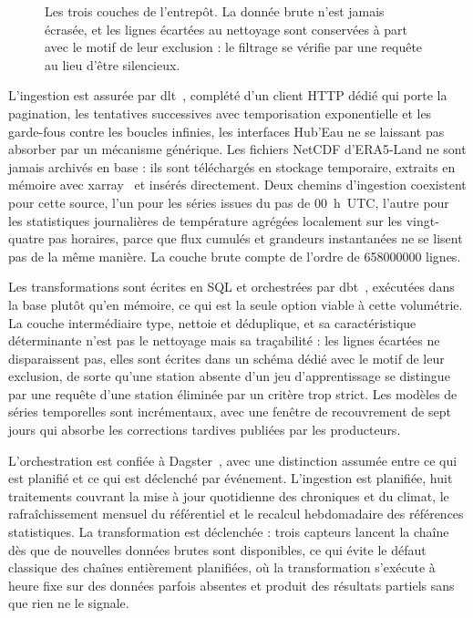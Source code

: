 \begin{figure}[H]
\caption{Les trois couches de l'entrepôt. La donnée brute n'est jamais écrasée, et les lignes écartées au nettoyage sont conservées à part avec le motif de leur exclusion : le filtrage se vérifie par une requête au lieu d'être silencieux.}
\label{fig:medaillon}
\end{figure}

L'ingestion est assurée par dlt~\cite{dlt}, complété d'un client HTTP dédié qui porte la pagination, les tentatives successives avec temporisation exponentielle et les garde-fous contre les boucles infinies, les interfaces Hub'Eau ne se laissant pas absorber par un mécanisme générique. Les fichiers NetCDF d'ERA5-Land ne sont jamais archivés en base : ils sont téléchargés en stockage temporaire, extraits en mémoire avec xarray~\cite{xarray} et insérés directement. Deux chemins d'ingestion coexistent pour cette source, l'un pour les séries issues du pas de \SI{00}{\hour}~UTC, l'autre pour les statistiques journalières de température agrégées localement sur les vingt-quatre pas horaires, parce que flux cumulés et grandeurs instantanées ne se lisent pas de la même manière. La couche brute compte de l'ordre de \num{658000000} lignes.

Les transformations sont écrites en SQL et orchestrées par dbt~\cite{dbt}, exécutées dans la base plutôt qu'en mémoire, ce qui est la seule option viable à cette volumétrie. La couche intermédiaire type, nettoie et déduplique, et sa caractéristique déterminante n'est pas le nettoyage mais sa traçabilité : les lignes écartées ne disparaissent pas, elles sont écrites dans un schéma dédié avec le motif de leur exclusion, de sorte qu'une station absente d'un jeu d'apprentissage se distingue par une requête d'une station éliminée par un critère trop strict. Les modèles de séries temporelles sont incrémentaux, avec une fenêtre de recouvrement de sept jours qui absorbe les corrections tardives publiées par les producteurs.

L'orchestration est confiée à Dagster~\cite{dagster}, avec une distinction assumée entre ce qui est planifié et ce qui est déclenché par événement. L'ingestion est planifiée, huit traitements couvrant la mise à jour quotidienne des chroniques et du climat, le rafraîchissement mensuel du référentiel et le recalcul hebdomadaire des références statistiques. La transformation est déclenchée : trois capteurs lancent la chaîne dès que de nouvelles données brutes sont disponibles, ce qui évite le défaut classique des chaînes entièrement planifiées, où la transformation s'exécute à heure fixe sur des données parfois absentes et produit des résultats partiels sans que rien ne le signale.

